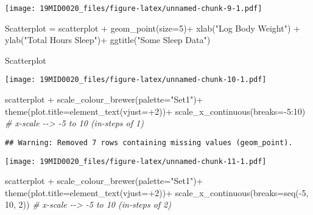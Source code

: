 \documentclass[
]{article}
\newenvironment{Shaded}{\begin{snugshade}}{\end{snugshade}}
\newcommand{\AttributeTok}[1]{\textcolor[rgb]{0.77,0.63,0.00}{#1}}
\newcommand{\CommentTok}[1]{\textcolor[rgb]{0.56,0.35,0.01}{\textit{#1}}}
\newcommand{\DecValTok}[1]{\textcolor[rgb]{0.00,0.00,0.81}{#1}}
\newcommand{\FunctionTok}[1]{\textcolor[rgb]{0.00,0.00,0.00}{#1}}
\newcommand{\NormalTok}[1]{#1}
\newcommand{\OtherTok}[1]{\textcolor[rgb]{0.56,0.35,0.01}{#1}}
\newcommand{\SpecialCharTok}[1]{\textcolor[rgb]{0.00,0.00,0.00}{#1}}
\newcommand{\StringTok}[1]{\textcolor[rgb]{0.31,0.60,0.02}{#1}}
\begin{document}
\texttt{[image: 19MID0020\_files/figure-latex/unnamed-chunk-9-1.pdf]}

\begin{Shaded}
\begin{Highlighting}[]
\NormalTok{Scatterplot }\OtherTok{=}\NormalTok{ scatterplot }\SpecialCharTok{+} \FunctionTok{geom\_point}\NormalTok{(}\AttributeTok{size=}\DecValTok{5}\NormalTok{)}\SpecialCharTok{+}
              \FunctionTok{xlab}\NormalTok{(}\StringTok{"Log Body Weight"}\NormalTok{) }\SpecialCharTok{+} 
              \FunctionTok{ylab}\NormalTok{(}\StringTok{"Total Hours Sleep"}\NormalTok{)}\SpecialCharTok{+}
              \FunctionTok{ggtitle}\NormalTok{(}\StringTok{"Some Sleep Data"}\NormalTok{)}

\NormalTok{Scatterplot}
\end{Highlighting}
\end{Shaded}

\texttt{[image: 19MID0020\_files/figure-latex/unnamed-chunk-10-1.pdf]}

\begin{Shaded}
\begin{Highlighting}[]
\NormalTok{scatterplot }\SpecialCharTok{+} \FunctionTok{scale\_colour\_brewer}\NormalTok{(}\AttributeTok{palette=}\StringTok{"Set1"}\NormalTok{)}\SpecialCharTok{+}
              \FunctionTok{theme}\NormalTok{(}\AttributeTok{plot.title=}\FunctionTok{element\_text}\NormalTok{(}\AttributeTok{vjust=}\SpecialCharTok{+}\DecValTok{2}\NormalTok{))}\SpecialCharTok{+}
              \FunctionTok{scale\_x\_continuous}\NormalTok{(}\AttributeTok{breaks=}\SpecialCharTok{{-}}\DecValTok{5}\SpecialCharTok{:}\DecValTok{10}\NormalTok{) }\CommentTok{\# x{-}scale {-}{-}\textgreater{} {-}5 to 10 (in{-}steps of 1)}
\end{Highlighting}
\end{Shaded}

\begin{verbatim}
## Warning: Removed 7 rows containing missing values (geom_point).
\end{verbatim}

\texttt{[image: 19MID0020\_files/figure-latex/unnamed-chunk-11-1.pdf]}

\begin{Shaded}
\begin{Highlighting}[]
\NormalTok{scatterplot }\SpecialCharTok{+} \FunctionTok{scale\_colour\_brewer}\NormalTok{(}\AttributeTok{palette=}\StringTok{"Set1"}\NormalTok{)}\SpecialCharTok{+}
              \FunctionTok{theme}\NormalTok{(}\AttributeTok{plot.title=}\FunctionTok{element\_text}\NormalTok{(}\AttributeTok{vjust=}\SpecialCharTok{+}\DecValTok{2}\NormalTok{))}\SpecialCharTok{+}
              \FunctionTok{scale\_x\_continuous}\NormalTok{(}\AttributeTok{breaks=}\FunctionTok{seq}\NormalTok{(}\SpecialCharTok{{-}}\DecValTok{5}\NormalTok{, }\DecValTok{10}\NormalTok{, }\DecValTok{2}\NormalTok{)) }\CommentTok{\# x{-}scale {-}{-}\textgreater{} {-}5 to 10 (in{-}steps of 2)}
\end{Highlighting}
\end{Shaded}
\end{document}
